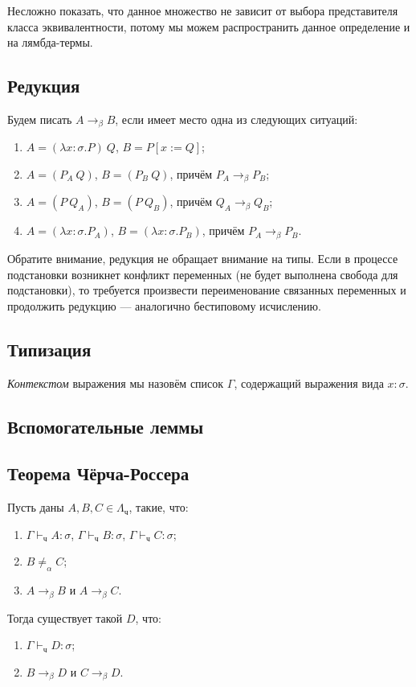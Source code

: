 \documentclass[10pt,a4paper,oneside]{article}
\begin{document}
Несложно показать, что данное множество не зависит от выбора представителя класса эквивалентности,
потому мы можем распространить данное определение и на лямбда-термы.

\subsection{Редукция}

Будем писать $A \rightarrow_\beta B$, если имеет место одна из следующих ситуаций:

\begin{enumerate}
\item $A = (\lambda x:\sigma.P)\ Q$, $B = P[x := Q]$;
\item $A = (P_A\ Q)$, $B = (P_B\ Q)$, причём $P_A\rightarrow_\beta P_B$;
\item $A = (P\ Q_A)$, $B = (P\ Q_B)$, причём $Q_A\rightarrow_\beta Q_B$;
\item $A = (\lambda x:\sigma.P_A)$, $B = (\lambda x:\sigma.P_B)$, причём $P_A\rightarrow_\beta P_B$.
\end{enumerate}

\noindent Обратите внимание, редукция не обращает внимание на типы. Если в процессе подстановки 
возникнет конфликт переменных (не будет выполнена свобода для подстановки), то требуется
произвести переименование связанных переменных и продолжить редукцию --- аналогично
бестиповому исчислению.

\subsection{Типизация}

\emph{Контекстом} выражения мы назовём список $\Gamma$, содержащий выражения вида $x : \sigma$.

\subsection{Вспомогательные леммы}

\subsection{Теорема Чёрча-Россера}

Пусть даны $A,B,C \in \Lambda_\texttt{ч}$, такие, что:
\begin{enumerate}
\item $\Gamma\vdash_\texttt{ч} A:\sigma$, $\Gamma\vdash_\texttt{ч} B:\sigma$, $\Gamma\vdash_\texttt{ч} C:\sigma$;
\item $B \ne_\alpha C$;
\item $A \rightarrow_\beta B$ и $A \rightarrow_\beta C$.
\end{enumerate}
Тогда существует такой $D$, что:
\begin{enumerate}
\item $\Gamma\vdash_\texttt{ч} D:\sigma$;
\item $B \rightarrow_\beta D$ и $C \rightarrow_\beta D$.
\end{enumerate}
\end{document}
